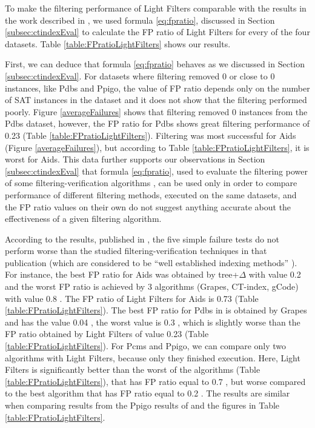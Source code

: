 \documentclass{l4proj}
\begin{document}
To make the filtering performance of Light Filters comparable with the results in the work described in \cite{foteini}, we used formula \ref{eq:fpratio}, discussed in Section \ref{subsec:ctindexEval} to calculate the FP ratio of Light Filters for every of the four datasets. Table \ref{table:FPratioLightFilters} shows our results.

First, we can deduce that formula \ref{eq:fpratio} behaves as we discussed in Section \ref{subsec:ctindexEval}. For datasets where filtering removed 0 or close to 0 instances, like Pdbs and Ppigo, the value of FP ratio depends only on the number of SAT instances in the dataset and it does not show that the filtering performed poorly. Figure \ref{averageFailures} shows that filtering removed 0 instances from the Pdbs dataset, however, the FP ratio for Pdbs shows great filtering performance of 0.23 (Table \ref{table:FPratioLightFilters}). Filtering was most successful for Aids (Figure \ref{averageFailures}), but according to Table \ref{table:FPratioLightFilters}, it is worst for Aids. This data further supports our observations in Section \ref{subsec:ctindexEval} that formula \ref{eq:fpratio}, used to evaluate the filtering power of some filtering-verification algorithms \cite{foteini}, can be used only in order to compare performance of different filtering methods, executed on the same datasets, and the FP ratio values on their own do not suggest anything accurate about the effectiveness of a given filtering algorithm. 

According to the results, published in \cite{foteini}, the five simple failure tests do not perform worse than the studied filtering-verification techniques in that publication (which are considered to be ``well established indexing methods'' \cite{foteini}). For instance, the best FP ratio for Aids was obtained by tree+$\Delta$ with value 0.2 \cite{foteini} and the worst FP ratio is achieved by 3 algorithms (Grapes, CT-index, gCode) with value 0.8 \cite{foteini}. The FP ratio of Light Filters for Aids is 0.73 (Table \ref{table:FPratioLightFilters}). The best FP ratio for Pdbs in \cite{foteini} is obtained by Grapes and has the value 0.04 \cite{foteini}, the worst value is 0.3 \cite{foteini}, which is slightly worse than the FP ratio obtained by Light Filters of value 0.23 (Table \ref{table:FPratioLightFilters}). For Pcms and Ppigo, we can compare only two algorithms with Light Filters, because only they finished execution. Here, Light Filters is significantly better than the worst of the algorithms (Table \ref{table:FPratioLightFilters}), that has FP ratio equal to 0.7 \cite{foteini}, but worse compared to the best algorithm that has FP ratio equal to 0.2 \cite{foteini}. The results are similar when comparing results from the Ppigo results of \cite{foteini} and the figures in Table \ref{table:FPratioLightFilters}.
\end{document}

